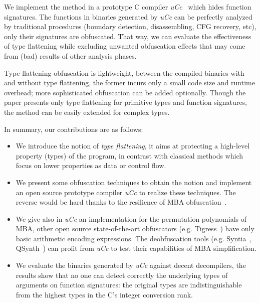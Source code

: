 \documentclass[compsoc,conference,a4paper,10pt,times]{IEEEtran}
\begin{document}
We implement the method in a prototype C compiler \emph{uCc}~\cite{ta_ucc_nodate} which hides
function signatures. The functions in binaries generated by \emph{uCc} can be
perfectly analyzed by traditional procedures (boundary detection, disassembling, CFG recovery, etc),
only their signatures are obfuscated. That way, we can evaluate the effectiveness of type
flattening while excluding unwanted obfuscation effects that may come from (bad) results
of other analysis phases.

Type flattening obfuscation is lightweight, between the compiled binaries with and without type
flattening, the former incurs only a small code size and runtime overhead; more sophisticated obfuscation
can be added optionally. Though the paper presents only type flattening for primitive types and function
signatures, the method can be easily extended for complex types.

In summary, our contributions are as follows:
\begin{itemize}
  \item We introduce the notion of \emph{type flattening}, it aims at protecting a high-level
  property (types) of the program, in contrast with classical methods which focus on lower
  properties as data or control flow.

  \item We present some obfuscation techniques to obtain the notion and implement an open source prototype
  compiler \emph{uCc} to realize these techniques.
  The reverse would be hard thanks to the resilience of MBA obfuscation~\cite{eyrolles_defeating_2016,biondi_effectiveness_2017}.

  \item We give also in \emph{uCc} an implementation for the permutation polynomials
  of MBA, other open source state-of-the-art obfuscators
  (e.g. Tigress~\cite{noauthor_tigress_nodate}) have only basic arithmetic encoding expressions.
  The deobfuscation tools (e.g. Syntia~\cite{blazytko_syntia_2017}, QSynth~\cite{david_qsynth_2020})
  can profit from \emph{uCc} to test their capabilities of MBA simplification.

  \item We evaluate the binaries generated by \emph{uCc} against decent decompilers, the results
  show that no one can detect correctly the underlying types of arguments on function signatures: the
  original types are indistinguishable from the highest types in the C's integer conversion rank.
\end{itemize}
\end{document}
